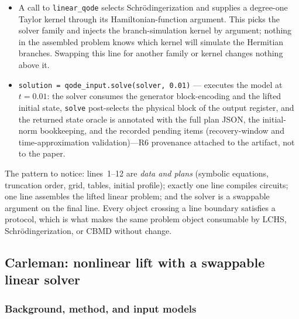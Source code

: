 \begin{itemize}
  enumerates the plan's blocks and couplings, evaluates the homotopy
  weights at $\eta{=}{-}0.4$, places each port into the lifted register at
  the block offsets the plan computes, and LCUs everything into one
  generator block-encoding.  The lifted initial state prepares the physical
  block from the normalized field and the tensor blocks from powers of the
  recorded norm, carrying $\log\lVert u_0\rVert$ as provenance.  What
  returns is a \texttt{QHAMInputModel}: generator, initial state, and the
  two adapters \texttt{solve} and \texttt{dissipative\_shift}.
\item A call to \texttt{linear\_qode} selects Schr\"odingerization and
  supplies a degree-one Taylor kernel through its Hamiltonian-function
  argument. This picks the solver family and injects the branch-simulation kernel by
  argument; nothing in the assembled problem knows which kernel will
  simulate the Hermitian branches.  Swapping this line for another family
  or kernel changes nothing above it.
\item \texttt{solution = qode\_input.solve(solver, 0.01)} --- executes the
  model at $t{=}0.01$: the solver consumes the generator block-encoding and
  the lifted initial state, \texttt{solve} post-selects the physical block
  of the output register, and the returned state oracle is annotated with
  the full plan JSON, the initial-norm bookkeeping, and the recorded
  pending items (recovery-window and time-approximation validation)---R6
  provenance attached to the artifact, not to the paper.
\end{itemize}

The pattern to notice: lines~1--12 are \emph{data and plans} (symbolic
equations, truncation order, grid, tables, initial profile); exactly one
line compiles circuits; one line assembles the lifted linear problem; and
the solver is a swappable argument on the final line.  Every object
crossing a line boundary satisfies a protocol, which is what makes the
same problem object consumable by LCHS, Schr\"odingerization, or CBMD
without change.

\subsection{Carleman: nonlinear lift with a swappable linear solver}
\label{app:carleman}

\subsubsection{Background, method, and input models}
\label{app:carleman-method}

